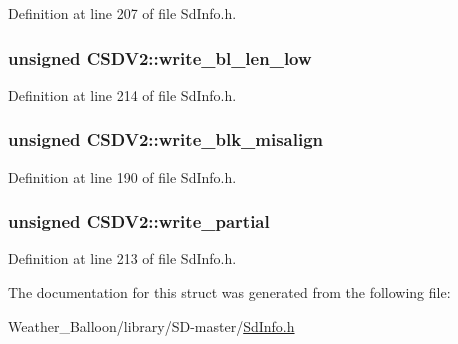 Definition at line 207 of file Sd\+Info.\+h.

\subsubsection[{\texorpdfstring{write\+\_\+bl\+\_\+len\+\_\+low}{write\_bl\_len\_low}}]{\setlength{\rightskip}{0pt plus 5cm}unsigned C\+S\+D\+V2\+::write\+\_\+bl\+\_\+len\+\_\+low}\hypertarget{struct_c_s_d_v2_a5455039cfbcd62d47d8777326a8332d5}{}\label{struct_c_s_d_v2_a5455039cfbcd62d47d8777326a8332d5}


Definition at line 214 of file Sd\+Info.\+h.

\subsubsection[{\texorpdfstring{write\+\_\+blk\+\_\+misalign}{write\_blk\_misalign}}]{\setlength{\rightskip}{0pt plus 5cm}unsigned C\+S\+D\+V2\+::write\+\_\+blk\+\_\+misalign}\hypertarget{struct_c_s_d_v2_a581efcca315ea376735dd9ca7f5172a8}{}\label{struct_c_s_d_v2_a581efcca315ea376735dd9ca7f5172a8}


Definition at line 190 of file Sd\+Info.\+h.

\subsubsection[{\texorpdfstring{write\+\_\+partial}{write\_partial}}]{\setlength{\rightskip}{0pt plus 5cm}unsigned C\+S\+D\+V2\+::write\+\_\+partial}\hypertarget{struct_c_s_d_v2_a5bdeb28b6b264d0da4d881881d135c7a}{}\label{struct_c_s_d_v2_a5bdeb28b6b264d0da4d881881d135c7a}


Definition at line 213 of file Sd\+Info.\+h.



The documentation for this struct was generated from the following file\+:\begin{DoxyCompactItemize}
\item 
Weather\+\_\+\+Balloon/library/\+S\+D-\/master/\hyperlink{_sd_info_8h}{Sd\+Info.\+h}\end{DoxyCompactItemize}
